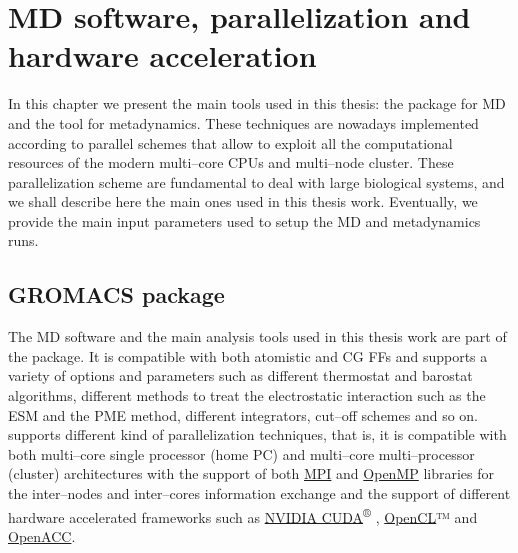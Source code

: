 \chapter{MD software, parallelization and hardware acceleration}
\label{chap:software}
In this chapter we present the main tools used in this thesis: the \href{http://www.gromacs.org}{\gromacs{}} 
package for \ac{MD} and the \href{http://www.plumed.org}{\plumed{}} tool for metadynamics. These techniques are 
nowadays implemented according to parallel schemes that allow to exploit all the computational resources of the 
modern multi--core CPUs and multi--node cluster. These parallelization scheme are fundamental to deal with large 
biological systems, and we shall describe here the main ones used in this thesis work. Eventually, we provide the 
main input parameters used to setup the \ac{MD} and metadynamics runs. 


\section{GROMACS package}
The \ac{MD} software and the main analysis tools used in this thesis work are part of the 
\href{http://www.gromacs.org}{\gromacs{}}\cite{gromacsManual} package. It is compatible with both atomistic and 
\ac{CG} \acp{FF} and supports a variety of options and parameters such as different thermostat and barostat 
algorithms, different methods to treat the electrostatic interaction such as the \ac{ESM} and the \ac{PME} 
method, different integrators, cut--off schemes and so on. \gromacs{} supports different kind of parallelization 
techniques, that is, it is compatible with both multi--core single processor (home PC) and multi--core 
multi--processor (cluster) architectures with the support of both 
\href{https://computing.llnl.gov/tutorials/mpi/}{MPI}
and \href{https://computing.llnl.gov/tutorials/openMP/}{OpenMP}
libraries for the inter--nodes and inter--cores information exchange and the support of different hardware 
accelerated frameworks such as \href{https://developer.nvidia.com/cuda-zone}{NVIDIA CUDA}\textsuperscript{®}
, \href{https://www.khronos.org/opencl/}{OpenCL}™
 and \href{http://www.openacc.org}{OpenACC}.

